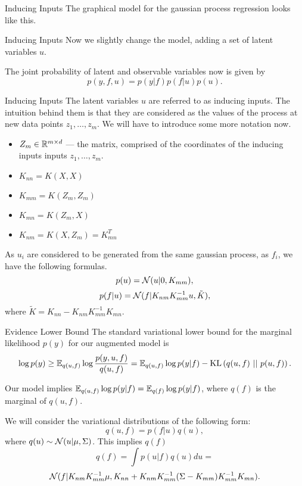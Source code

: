 \begin{frame}{Inducing Inputs}
	The graphical model for the gaussian process regression looks like this.
	\begin{figure}[!h]
		\centering
		\subfloat{
			\scalebox{0.5}{
				
			}
		}
	\end{figure}
\end{frame}

\begin{frame}{Inducing Inputs}
	Now we slightly change the model, adding a set of latent variables $u$.
	\begin{figure}[!h]
		\centering
		\subfloat{
			\scalebox{0.5}{
				
			}
		}
	\end{figure}
	The joint probability of latent and observable variables now is given by
	$$p(y, f, u) = p(y | f) p(f | u) p(u).$$
\end{frame}

\begin{frame}{Inducing Inputs}
	The latent variables $u$ are referred to as inducing inputs. The intuition behind them is that they are considered as the values of the process at new data points $z_1, \ldots, z_m$. We will have to introduce some more notation now.

	\begin{itemize}
		\item $Z_m \in \mathbb{R}^{m \times d}$ — the matrix, comprised of the coordinates of the inducing inputs inputs $z_1, \ldots, z_m$.
		\item $K_{nn} = K(X, X)$
		\item $K_{mm} = K(Z_m, Z_m)$
		\item $K_{mn} = K(Z_m, X)$
		\item $K_{nm} = K(X, Z_m) = K_{mn}^T$ 
	\end{itemize}
	As $u_i$ are considered to be generated from the same gaussian process, as $f_i$, we have the following formulas.
	$$p(u) = \mathcal{N}(u|0, K_{mm}),$$
	$$p(f|u) = \mathcal{N} (f|K_{nm} K_{mm}^{-1}u, \tilde K),$$
	where $\tilde K = K_{nn} - K_{nm} K_{mm}^{-1} K_{mn}.$
\end{frame}

\begin{frame}{Evidence Lower Bound}
	The standard variational lower bound for the marginal likelihood $p(y)$ for our augmented model is
	$$\log p(y) \ge \mathbb{E}_{q(u, f)} \log \frac {p(y, u, f)}{q(u, f)} = \mathbb{E}_{q(u, f)}\log p(y | f) - \mbox{KL}\left(q(u, f)\mbox{ || }p(u, f)\right).$$

	Our model implies $\mathbb{E}_{q(u, f)} \log p(y | f) = \mathbb{E}_{q(f)} \log p(y | f)$, where $q(f)$ is the marginal of $q(u, f)$.

	We will consider the variational distributions of the following form:
	$$q(u, f) = p(f | u) q(u),$$
	where $q(u) \sim \mathcal{N}(u|\mu, \Sigma)$. This implies $q(f)$
	$$q(f) = \int p(u | f) q(u) du = $$
	$$\mathcal{N}(f| K_{nm} K_{mm}^{-1} \mu, K_{nn} + K_{nm} K_{mm}^{-1}(\Sigma - K_{mm}) K_{mm}^{-1} K_{mn}).$$
\end{frame}

